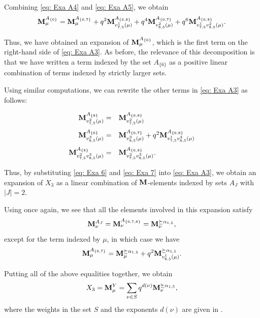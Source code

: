 \begin{example}
Combining \eqref{eq: Exa A4} and \eqref{eq: Exa A5}, we obtain
\begin{equation} \label{eq: Exa 6}
   \mathbf{M}_{\mu}^{A_{\{6\}}}=   \mathbf{M}_{\mu}^{A_{\{6,7\}}} +q^2     \mathbf{M}_{v_{7,5}^1(\mu)}^{A_{\{6,8\}}} +q^4 \mathbf{M}_{v_{8,5}^2(\mu )}^{A_{\{6,7\}}}  + q^6  \mathbf{M}_{v_{7,5}^1v_{8,5}^2(\mu )}^{A_{\{6,8\}}}. 
\end{equation}

Thus, we have obtained an expansion of $\mathbf{M}_{\mu}^{A_{\{6\}}}$, which is the first term on the right-hand side of \eqref{eq: Exa A3}.
As before, the relevance of this decomposition is that we have written a term indexed by the set $A_{\{6\}}$ as a positive linear combination of terms indexed by strictly larger sets.

Using similar computations, we can rewrite the other terms in \eqref{eq: Exa A3} as follows:

\begin{equation} \label{eq: Exa 7}
    \begin{array}{rl}
      \mathbf{M}_{v_{7,5}^2(\mu)}^{A_{\{8\}}} =       &  \mathbf{M}_{v_{7,5}^2(\mu)}^{A_{\{6,8\}}} \\[10pt]
     \mathbf{M}_{v_{8,5}^3(\mu)}^{A_{\{6\}}}  =     &  \mathbf{M}_{v_{8,5}^3(\mu)}^{A_{\{6,7\}}} +q^2 \mathbf{M}_{v_{7,5}^1v_{8,5}^3(\mu)}^{A_{\{6,8\}}}    \\[10pt]
     \mathbf{M}_{v_{7,5}^2v_{8,5}^3(\mu)}^{A_{\{8\}}} =   & 
      \mathbf{M}_{v_{7,5}^2v_{8,5}^3(\mu)}^{A_{\{6,8\}}}.
    \end{array}
\end{equation}

Thus, by substituting \eqref{eq: Exa 6} and \eqref{eq: Exa 7} into \eqref{eq: Exa A3}, we obtain an expansion of $X_3$ as a linear combination of $\mathbf{M}$-elements indexed by sets $A_{J}$ with $|J|=2$. 

Using  once again, we see that all the elements involved in this expansion satisfy
\[
\mathbf{M}_{\nu}^{A_{J}}=\mathbf{M}_{\nu}^{A_{\{6,7,8\}}} =\mathbf{M}_{\nu}^{\succeq \alpha_{1,5}},
\]
except for the term indexed by $\mu$, in which case we have
\begin{equation}
    \mathbf{M}_{\mu}^{A_{\{6,7\}}} = \mathbf{M}_{\mu}^{\succeq \alpha_{1,5}} + q^2\mathbf{M}_{v_{8,5}^1(\mu )}^{\succeq \alpha_{1,5}} .
\end{equation}

Putting all of the above equalities together, we obtain
\begin{equation}
   X_3= \mathbf{M}_{\mu}^Y = \sum_{\nu\in S} q^{d(\nu)} \mathbf{M}_{\nu}^{\succeq \alpha_{1,5}}, 
\end{equation}
where the weights in the set $S$ and the exponents $d(\nu)$ are given in . 
\end{example}


